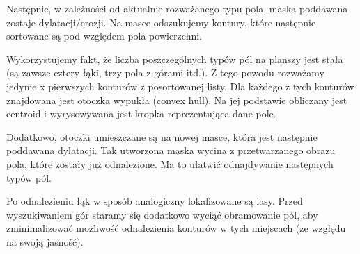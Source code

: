 \documentclass[a4paper]{article}
\begin{document}
	Następnie, w zależności od aktualnie rozważanego typu pola, maska poddawana zostaje dylatacji/erozji. Na masce odszukujemy kontury, które następnie sortowane są pod względem pola powierzchni.
	
Wykorzystujemy fakt, że liczba poszczególnych typów pól na planszy jest stała (są zawsze cztery łąki, trzy pola z górami itd.). Z tego powodu rozważamy jedynie x pierwszych konturów z posortowanej listy.
Dla każdego z tych konturów znajdowana jest otoczka wypukła (convex hull). Na jej podstawie obliczany jest centroid i wyrysowywana jest kropka reprezentująca dane pole. 

Dodatkowo, otoczki umieszczane są na nowej masce, która jest następnie poddawana dylatacji. Tak utworzona maska wycina z przetwarzanego obrazu pola, które zostały już odnalezione. Ma to ułatwić odnajdywanie następnych typów pól.
	
Po odnalezieniu łąk w sposób analogiczny lokalizowane są lasy. Przed wyszukiwaniem gór staramy się dodatkowo wyciąć obramowanie pól, aby zminimalizować możliwość odnalezienia konturów w tych miejscach (ze względu na swoją jasność).
\end{document}
